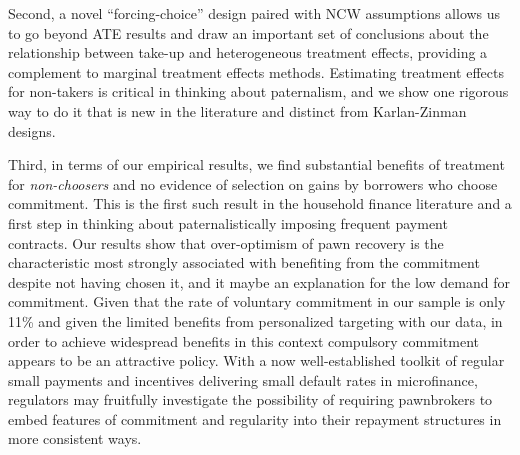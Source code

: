 \documentclass[12pt, a4paper]{article}
\begin{document}


Second, a novel ``forcing-choice'' design paired with NCW assumptions allows us to go beyond ATE results and draw an important set of conclusions about the relationship between take-up and heterogeneous treatment effects, providing a complement to marginal treatment effects methods. %
Estimating treatment effects for non-takers is critical in thinking about paternalism, and we show one rigorous way to do it that is new in the literature and distinct from Karlan-Zinman designs. 

Third, in terms of our empirical results, we find substantial benefits of treatment for \textit{non-choosers} and no evidence of selection on gains by borrowers who choose commitment. This is the first such result in the household finance literature and a first step in thinking about paternalistically imposing frequent payment contracts. Our results show that over-optimism of pawn recovery is the characteristic most strongly associated with benefiting from the commitment despite not having chosen it, and it maybe an explanation for the low demand for commitment. Given that the rate of voluntary commitment in our sample is only 11\% and given the limited benefits from personalized targeting with our data, in order to achieve widespread benefits in this context compulsory commitment appears to be an attractive policy. With a now well-established toolkit of regular small payments and incentives delivering small default rates in microfinance, regulators may fruitfully investigate the possibility of requiring pawnbrokers to embed features of commitment and regularity into their repayment structures in more consistent ways.



\end{document}
